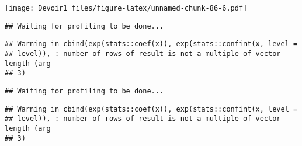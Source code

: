 \documentclass[]{article}
\newenvironment{Shaded}{\begin{snugshade}}{\end{snugshade}}
\newcommand{\KeywordTok}[1]{\textcolor[rgb]{0.13,0.29,0.53}{\textbf{#1}}}
\newcommand{\DataTypeTok}[1]{\textcolor[rgb]{0.13,0.29,0.53}{#1}}
\newcommand{\DecValTok}[1]{\textcolor[rgb]{0.00,0.00,0.81}{#1}}
\newcommand{\StringTok}[1]{\textcolor[rgb]{0.31,0.60,0.02}{#1}}
\newcommand{\OperatorTok}[1]{\textcolor[rgb]{0.81,0.36,0.00}{\textbf{#1}}}
\newcommand{\NormalTok}[1]{#1}
\begin{document}
\texttt{[image: Devoir1\_files/figure-latex/unnamed-chunk-86-6.pdf]}

\begin{Shaded}
\end{Shaded}

\begin{verbatim}
## Waiting for profiling to be done...
\end{verbatim}

\begin{verbatim}
## Warning in cbind(exp(stats::coef(x)), exp(stats::confint(x, level =
## level)), : number of rows of result is not a multiple of vector length (arg
## 3)
\end{verbatim}

\begin{verbatim}
## Waiting for profiling to be done...
\end{verbatim}

\begin{verbatim}
## Warning in cbind(exp(stats::coef(x)), exp(stats::confint(x, level =
## level)), : number of rows of result is not a multiple of vector length (arg
## 3)
\end{verbatim}
\end{document}
